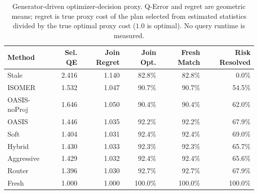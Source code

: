 \begin{table}[t]
  \centering
  \small
  \caption{Generator-driven optimizer-decision proxy. Q-Error and regret are geometric means; regret is true proxy cost of the plan selected from estimated statistics divided by the true optimal proxy cost ($1.0$ is optimal). No query runtime is measured.}
  \label{tab:optimizer_decision_proxy}
  \setlength{\tabcolsep}{4pt}
  \begin{tabular}{lrrrrr}
    \toprule
    Method & Sel. QE & Join Regret & Join Opt. & Fresh Match & Risk Resolved \\
    \midrule
    Stale & 2.416 & 1.140 & 82.8\% & 82.8\% & 0.0\% \\
    ISOMER & 1.532 & 1.047 & 90.7\% & 90.7\% & 54.5\% \\
    OASIS-noProj & 1.646 & 1.050 & 90.4\% & 90.4\% & 62.0\% \\
    OASIS & 1.446 & 1.035 & 92.2\% & 92.2\% & 67.9\% \\
    Soft & 1.404 & 1.031 & 92.4\% & 92.4\% & 69.0\% \\
    Hybrid & 1.430 & 1.033 & 92.3\% & 92.3\% & 65.7\% \\
    Aggressive & 1.429 & 1.032 & 92.4\% & 92.4\% & 65.6\% \\
    Router & 1.396 & 1.030 & 92.7\% & 92.7\% & 67.9\% \\
    Fresh & 1.000 & 1.000 & 100.0\% & 100.0\% & 100.0\% \\
    \bottomrule
  \end{tabular}
\end{table}
